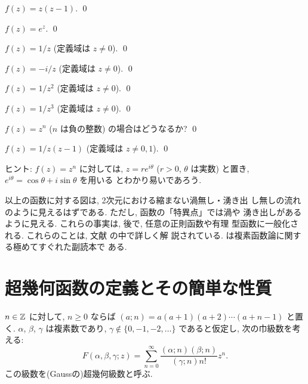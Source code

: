 \documentclass[12pt,twoside]{jarticle}
\begin{document}
\begin{question}
  $f(z) = z(z-1)$. \qed
\end{question}

\begin{question}
  $f(z) = e^z$. \qed
\end{question}

\begin{question}
  $f(z) = 1/z$ \quad (定義域は $z\ne0$). \qed
\end{question}

\begin{question}
  $f(z) = -i/z$ \quad (定義域は $z\ne0$). \qed
\end{question}

\begin{question}
  $f(z) = 1/z^2$ \quad (定義域は $z\ne0$). \qed
\end{question}

\begin{question}
  $f(z) = 1/z^3$ \quad (定義域は $z\ne0$). \qed
\end{question}

\begin{question}
  $f(z) = z^n$ ($n$ は負の整数) の場合はどうなるか? \qed
\end{question}

\begin{question}
  $f(z) = 1/z(z-1)$ \quad (定義域は $z\ne0,1$). \qed
\end{question}

\noindent ヒント: $f(z)=z^n$ に対しては, $z=re^{i\theta}$ ($r>0$,
$\theta$ は実数) と置き, $e^{i\theta}=\cos\theta+i\sin\theta$ を用いる
とわかり易いであろう. 

\noindent 以上の函数に対する図は, 2次元における縮まない渦無し・湧き出
し無しの流れのように見えるはずである. ただし, 函数の「特異点」では渦や
湧き出しがあるように見える. これらの事実は, 後で, 任意の正則函数や有理
型函数に一般化される. これらのことは, 文献 \cite{Imai} の中で詳しく解
説されている.  \cite{Imai} は複素函数論に関する極めてすぐれた副読本で
ある.



\section{超幾何函数の定義とその簡単な性質}

$n\in{\mathbb Z}$ に対して, $n\ge 0$ ならば $(a;n) = a(a+1)(a+2)\cdots(a+n-1)$ %
と置く. $\alpha$, $\beta$, $\gamma$ は複素数であり, 
$\gamma\notin\{0,-1,-2,\dots\}$ であると仮定し, 次の巾級数を考える:
\[
  F(\alpha,\beta,\gamma; z) 
  = \sum_{n=0}^{\infty} \frac{(\alpha;n)(\beta;n)}{(\gamma;n)n!} z^n.
\]
この級数を(Gaussの)超幾何級数と呼ぶ.
\end{document}
